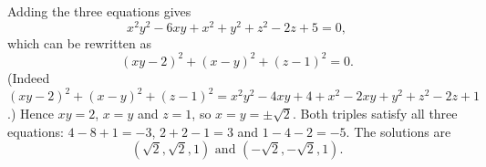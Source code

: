 Adding the three equations gives
\[x^2y^2-6xy+x^2+y^2+z^2-2z+5=0,\]
which can be rewritten as
\[(xy-2)^2+(x-y)^2+(z-1)^2=0.\]
(Indeed $(xy-2)^2+(x-y)^2+(z-1)^2=x^2y^2-4xy+4+x^2-2xy+y^2+z^2-2z+1$.) Hence $xy=2$, $x=y$ and $z=1$, so $x=y=\pm\sqrt2$. Both triples satisfy all three equations: $4-8+1=-3$, $2+2-1=3$ and $1-4-2=-5$. The solutions are
\[\boxed{\left(\sqrt2,\sqrt2,1\right)\text{ and }\left(-\sqrt2,-\sqrt2,1\right)}.\]
